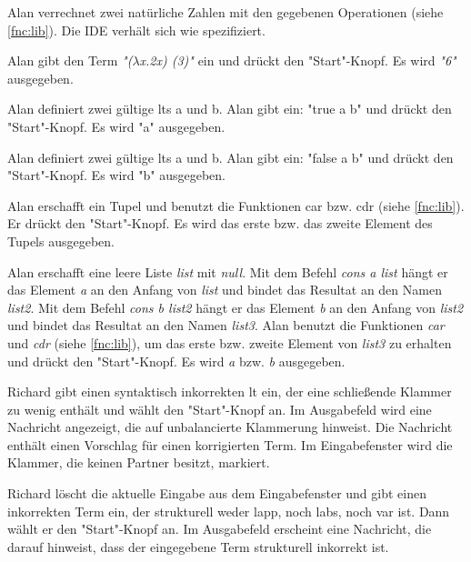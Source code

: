\documentclass[parskip=full,11pt,twoside]{scrartcl}
\begin{document}
{Alan verrechnet zwei natürliche Zahlen mit den gegebenen Operationen (siehe \ref{fnc:lib}).}
{Die IDE verhält sich wie spezifiziert.}

{Alan gibt den Term \emph{"($\lambda$x.2x) (3)"} ein und drückt den "Start"-Knopf.}
{Es wird \emph{"6"} ausgegeben.}

{Alan definiert zwei gültige \glspl{lt} a und b.
 Alan gibt ein: "true a b" und drückt den "Start"-Knopf.}
{Es wird "a" ausgegeben.}

{Alan definiert zwei gültige \glspl{lt} a und b.
 Alan gibt ein: "false a b" und drückt den "Start"-Knopf.}
{Es wird "b" ausgegeben.}

{Alan erschafft ein Tupel und benutzt die Funktionen car bzw. cdr (siehe \ref{fnc:lib}).
 Er drückt den "Start"-Knopf.}
{Es wird das erste bzw. das zweite Element des Tupels ausgegeben.}

{Alan erschafft eine leere Liste \emph{list} mit \emph{null}. 
 Mit dem Befehl \emph{cons a list} hängt er das Element \emph{a} an den Anfang von \emph{list} und bindet das Resultat
 an den Namen \emph{list2}.
 Mit dem Befehl \emph{cons b list2} hängt er das Element \emph{b} an den Anfang von \emph{list2} und bindet das
 Resultat an den Namen \emph{list3}.
 Alan benutzt die Funktionen \emph{car} und \emph{cdr} (siehe \ref{fnc:lib}), um das erste bzw. zweite Element von \emph{list3}
 zu erhalten
 und drückt den "Start"-Knopf.}
{Es wird \emph{a} bzw. \emph{b} ausgegeben.}


{Richard gibt einen syntaktisch inkorrekten \gls{lt} ein, der eine schließende Klammer
zu wenig enthält und wählt den "Start"-Knopf an.}
{Im Ausgabefeld wird eine Nachricht angezeigt, die auf unbalancierte Klammerung hinweist.
Die Nachricht enthält einen Vorschlag für einen korrigierten Term. Im Eingabefenster wird
die Klammer, die keinen Partner besitzt, markiert.}

{Richard löscht die aktuelle Eingabe aus dem Eingabefenster und gibt einen inkorrekten Term ein, der strukturell weder \gls{lapp}, noch
\gls{labs}, noch \gls{var} ist. Dann wählt er den "Start"-Knopf an.}
{Im Ausgabefeld erscheint eine Nachricht, die darauf hinweist, dass der eingegebene
Term strukturell inkorrekt ist.}
\end{document}
